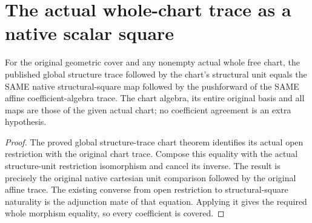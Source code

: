 \section{The actual whole-chart trace as a native scalar square}

\begin{lemma}
\label{lem:kn-original-whole-chart-structure-square}
\leanok
For the original geometric cover and any nonempty actual whole free
chart, the published global structure trace followed by the chart's
structural unit equals the SAME native structural-square map followed
by the pushforward of the SAME affine coefficient-algebra trace. The
chart algebra, its entire original basis and all maps are those of the
given actual chart; no coefficient agreement is an extra hypothesis.
\end{lemma}
\begin{proof}
The proved global structure-trace chart theorem identifies
its actual open restriction with the original chart trace. Compose
this equality with the actual structure-unit restriction isomorphism
and cancel its inverse. The result is precisely the original native
cartesian unit comparison followed by the original affine trace.
The existing converse from open restriction to structural-square
naturality is the adjunction mate of that equation. Applying it gives
the required whole morphism equality, so every coefficient is covered.
\end{proof}

